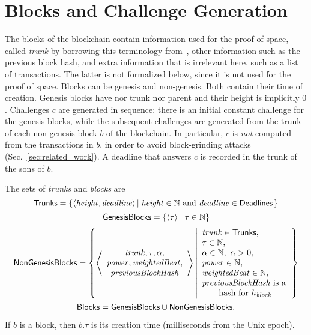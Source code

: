 \section{Blocks and Challenge Generation}\label{sec:challenge_generation}
%
The blocks of the blockchain contain information used for the proof
of space, called \emph{trunk} by borrowing this terminology from~\cite{CohenP19},
other information such as the previous block hash,
and extra information that is irrelevant here, such as a list of transactions.
The latter is not formalized below, since it is not used for the proof of space.
Blocks can be genesis and non-genesis. Both contain their time of creation.
Genesis blocks have nor trunk nor parent and their height is implicitly $0$.
Challenges $c$ are generated in sequence: there is an initial constant challenge for the genesis
blocks, while the subsequent challenges are generated from the trunk of
each non-genesis block $b$ of the blockchain.
In particular, $c$ is \emph{not} computed from the transactions in $b$,
in order to avoid block-grinding attacks (Sec.~\ref{sec:related_work}).
A deadline that answers $c$ is recorded in the trunk of the sons of $b$.
%
\begin{definition}\label{def:trunk}
  The sets of \emph{trunks} and \emph{blocks} are
  \[
  {\mathsf{Trunks}}=\left\{\langle{\mathit{height}},{\mathit{deadline}}\rangle\left|\;{\mathit{height}}\in\mathbb{N}\text{ and }{\mathit{deadline}}\in{\mathsf{Deadlines}}\right.\right\}
  \]
  \[
  {\mathsf{GenesisBlocks}}=\left\{\langle\tau\rangle\mid\tau\in\mathbb{N}\right\}
  \]
  \[
  {\mathsf{NonGenesisBlocks}}=\left\{\left\langle\begin{array}{c}
  {\mathit{trunk}},\tau,\alpha,\\
  {\mathit{power}},{\mathit{weightedBeat}},\\
  {\mathit{previousBlockHash}}
  \end{array}\right\rangle\left|\begin{array}{l}
  {\mathit{trunk}}\in{\mathsf{Trunks}},\\
  \tau\in\mathbb{N},\\
  \alpha\in\mathbb{N},\ \alpha>0,\\
  {\mathit{power}}\in\mathbb{N},\\
  {\mathit{weightedBeat}}\in\mathbb{N},\\
  {\mathit{previousBlockHash}}\text{ is a}\\
  \qquad\text{hash for $h_{\mathit{block}}$}
  \end{array}\right.\right\}
  \]
  \[
  {\mathsf{Blocks}}={\mathsf{GenesisBlocks}}\cup{\mathsf{NonGenesisBlocks}}.
  \]
\end{definition}
%
If $b$ is a block, then $b.\tau$ is its creation time (milliseconds from the Unix epoch).
